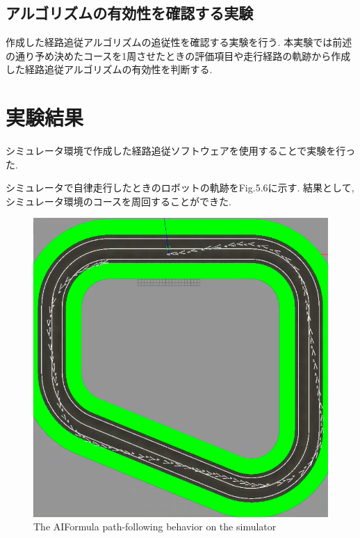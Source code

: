 \subsection{アルゴリズムの有効性を確認する実験}
作成した経路追従アルゴリズムの追従性を確認する実験を行う.
本実験では前述の通り予め決めたコースを1周させたときの評価項目や走行経路の軌跡から作成した経路追従アルゴリズムの有効性を判断する.

\section{実験結果}
シミュレータ環境で作成した経路追従ソフトウェアを使用することで実験を行った.

シミュレータで自律走行したときのロボットの軌跡をFig.5.6に示す.
結果として, シミュレータ環境のコースを周回することができた.

\begin{figure}[H]
  \centering
 \includegraphics[keepaspectratio, scale=0.5]
      {images/simulatorfollowerpath.png}
 \caption{The AIFormula path-following behavior on the simulator}
 \label{fig:simulatorpath}
\end{figure}